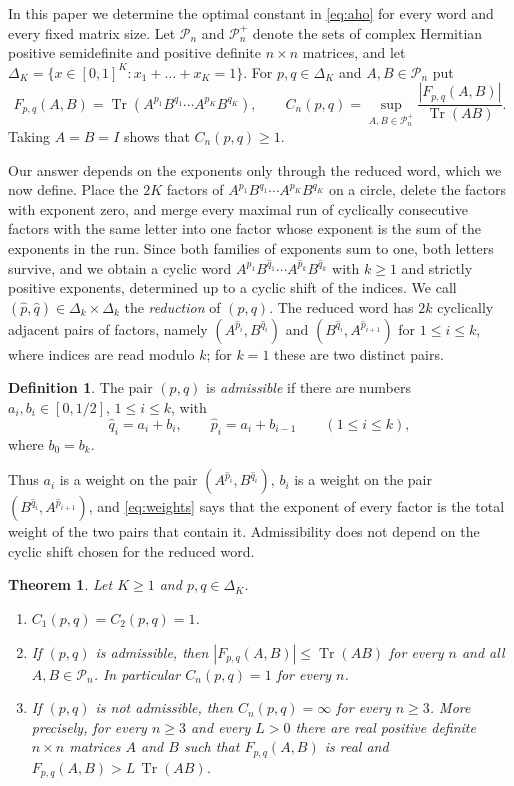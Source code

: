 \documentclass{amsart}
\newtheorem{theorem}{Theorem}[section]
\theoremstyle{definition}
\newtheorem*{definition}{Definition}
\theoremstyle{remark}
\numberwithin{equation}{section}
\newcommand{\Tr}{\operatorname{Tr}}
\newcommand{\PSD}{\mathcal{P}_n}
\newcommand{\PD}{\mathcal{P}_n^{+}}
\begin{document}
In this paper we determine the optimal constant in \eqref{eq:aho} for every word and every fixed matrix size. Let $\PSD$ and $\PD$ denote the sets of complex Hermitian positive semidefinite and positive definite $n\times n$ matrices, and let $\Delta_K=\{x\in[0,1]^K:x_1+\dots+x_K=1\}$. For $p,q\in\Delta_K$ and $A,B\in\PSD$ put
\[
F_{p,q}(A,B)=\Tr(A^{p_1}B^{q_1}\cdots A^{p_K}B^{q_K}),\qquad
C_n(p,q)=\sup_{A,B\in\PD}\frac{|F_{p,q}(A,B)|}{\Tr(AB)} .
\]
Taking $A=B=I$ shows that $C_n(p,q)\ge 1$.

Our answer depends on the exponents only through the reduced word, which we now define. Place the $2K$ factors of $A^{p_1}B^{q_1}\cdots A^{p_K}B^{q_K}$ on a circle, delete the factors with exponent zero, and merge every maximal run of cyclically consecutive factors with the same letter into one factor whose exponent is the sum of the exponents in the run. Since both families of exponents sum to one, both letters survive, and we obtain a cyclic word $A^{\hat p_1}B^{\hat q_1}\cdots A^{\hat p_k}B^{\hat q_k}$ with $k\ge 1$ and strictly positive exponents, determined up to a cyclic shift of the indices. We call $(\hat p,\hat q)\in\Delta_k\times\Delta_k$ the \emph{reduction} of $(p,q)$. The reduced word has $2k$ cyclically adjacent pairs of factors, namely $(A^{\hat p_i},B^{\hat q_i})$ and $(B^{\hat q_i},A^{\hat p_{i+1}})$ for $1\le i\le k$, where indices are read modulo $k$; for $k=1$ these are two distinct pairs.

\begin{definition}
The pair $(p,q)$ is \emph{admissible} if there are numbers $a_i,b_i\in[0,1/2]$, $1\le i\le k$, with
\begin{equation}\label{eq:weights}
\hat q_i=a_i+b_i,\qquad \hat p_i=a_i+b_{i-1}\qquad(1\le i\le k),
\end{equation}
where $b_0=b_k$.
\end{definition}

Thus $a_i$ is a weight on the pair $(A^{\hat p_i},B^{\hat q_i})$, $b_i$ is a weight on the pair $(B^{\hat q_i},A^{\hat p_{i+1}})$, and \eqref{eq:weights} says that the exponent of every factor is the total weight of the two pairs that contain it. Admissibility does not depend on the cyclic shift chosen for the reduced word.

\begin{theorem}\label{thm:main}
Let $K\ge 1$ and $p,q\in\Delta_K$.
\begin{enumerate}
\item[(a)] $C_1(p,q)=C_2(p,q)=1$.
\item[(b)] If $(p,q)$ is admissible, then $|F_{p,q}(A,B)|\le\Tr(AB)$ for every $n$ and all $A,B\in\PSD$. In particular $C_n(p,q)=1$ for every $n$.
\item[(c)] If $(p,q)$ is not admissible, then $C_n(p,q)=\infty$ for every $n\ge 3$. More precisely, for every $n\ge 3$ and every $L>0$ there are real positive definite $n\times n$ matrices $A$ and $B$ such that $F_{p,q}(A,B)$ is real and $F_{p,q}(A,B)>L\,\Tr(AB)$.
\end{enumerate}
\end{theorem}
\end{document}
